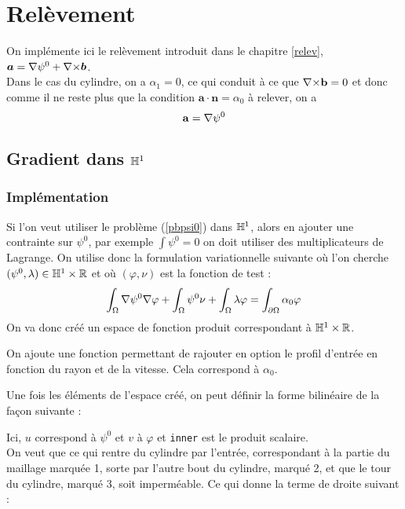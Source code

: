 \chapter{Relèvement}
On implémente ici le relèvement introduit dans le chapitre \ref{relev}, $\bm{a}={\nabla}\psi^0+{\nabla\times}\bm{b}$.\\
Dans le cas du cylindre, on a $\alpha_1=0$, ce qui conduit à ce que ${\nabla\times} \mathbf{b}=0$ et donc comme il ne reste plus que la condition $\bm{a}\cdot\bm{n}=\alpha_0$ à relever, on a \[ \mathbf{a}={\nabla}\psi^0 \]

\section{Gradient dans ${\mathbb{H}}^1$}
\label{impGradh1}
\subsection{Implémentation}
Si l'on veut utiliser le problème (\ref{pbpsi0}) dans ${\mathbb{H}}^1$, alors en ajouter une contrainte sur $\psi^0$, par exemple $\int \psi^0 = 0$ on doit utiliser des multiplicateurs de Lagrange. On utilise donc la formulation variationnelle suivante où l'on cherche $(\psi^0,\lambda)\in {\mathbb{H}}^1\times{\mathbb{R}}$ et où $(\varphi,\nu)$ est la fonction de test :
\[ \int_\Omega{\nabla} \psi^0{\nabla}\varphi + \int_\Omega \psi^0\nu + \int_\Omega \lambda\varphi = \int_{\partial\Omega} \alpha_0\varphi \]
On va donc créé un espace de fonction produit correspondant à ${\mathbb{H}}^1\times{\mathbb{R}}$.



On ajoute une fonction permettant de rajouter en option le profil d'entrée en fonction du rayon et de la vitesse. Cela correspond à $\alpha_0$.



Une fois les éléments de l'espace créé, on peut définir la forme bilinéaire de la façon suivante :



Ici, $u$ correspond à $\psi^0$ et $v$ à $\varphi$ et \texttt{inner} est le produit scalaire.\\

On veut que ce qui rentre du cylindre par l'entrée, correspondant à la partie du maillage marquée 1, sorte par l'autre bout du cylindre, marqué 2, et que le tour du cylindre, marqué 3, soit imperméable. Ce qui donne la terme de droite suivant :

